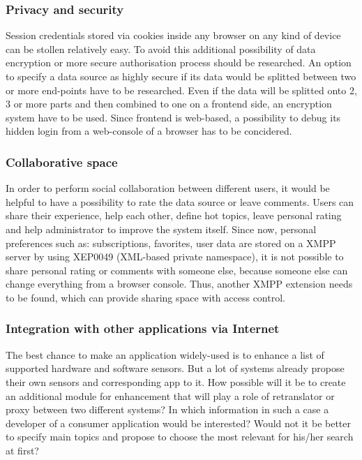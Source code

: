 \subsubsection{Privacy and security}
Session credentials stored via cookies inside any browser on any kind of device can be stollen relatively easy. To avoid this additional possibility of data encryption or more secure authorisation process should be researched.
\newline
An option to specify a data source as highly secure if its data would be splitted between two or more end-points have to be researched. Even if the data will be splitted onto 2, 3 or more parts and then combined to one on a frontend side, an encryption system have to be used. Since frontend is web-based, a possibility to debug its hidden login from a web-console of a browser has to be concidered.

\subsubsection{Collaborative space}
 In order to perform social collaboration between different users, it would be helpful to have a possibility to rate the data source or leave comments. Users can share their experience, help each other, define hot topics, leave personal rating and help administrator to improve the system itself. Since now, personal preferences such as: subscriptions, favorites, user data are stored on a XMPP server by using XEP0049 (XML-based private namespace), it is not possible to share personal rating or comments with someone else, because someone else can change everything from a  browser console. Thus, another XMPP extension needs to be found, which can provide sharing space with access control.  

\subsubsection {Integration with other applications via Internet}
 The best chance to make an application widely-used is to enhance a list of supported hardware and software sensors. But a lot of systems already propose their own sensors and corresponding app to it. How possible will it be to create an additional module for enhancement that will play a role of retranslator or proxy between two different systems? In which information in such a case a developer of a consumer application would be interested? Would not it be better to specify main topics and propose to choose the most relevant for his/her search at first?

